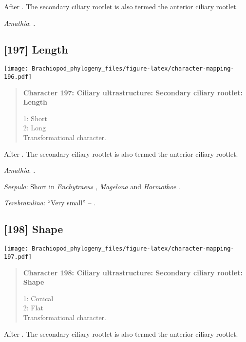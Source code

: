 \documentclass[openany]{book}
\theoremstyle{definition}
\theoremstyle{definition}
\theoremstyle{definition}
\theoremstyle{remark}
\begin{document}
After \citet{Lundin2009}. The secondary ciliary rootlet is also termed
the anterior ciliary rootlet.

\hypertarget{Amathia-coding-196}{}
\emph{Amathia}: \citet{Reed1982}.

\subsection*{{[}197{]} Length}\label{length-1}

\texttt{[image: Brachiopod\_phylogeny\_files/figure-latex/character-mapping-196.pdf]}

\begin{quote}
\textbf{Character 197: Ciliary ultrastructure: Secondary ciliary
rootlet: Length}

1: Short\\
2: Long\\
Transformational character.
\end{quote}

After \citet{Lundin2009}. The secondary ciliary rootlet is also termed
the anterior ciliary rootlet.

\hypertarget{Amathia-coding-197}{}
\emph{Amathia}: \citet{Reed1982}.

\hypertarget{Serpula-coding-197}{}
\emph{Serpula}: Short in \emph{Enchytraeus} \citep{Reger1967},
\emph{Magelona} \citep{Bartolomaeus1995} and \emph{Harmothoe}
\citep{Holborow1969}.

\hypertarget{Terebratulina-coding-197}{}
\emph{Terebratulina}: ``Very small'' -- \citet{Luter1995}.

\subsection*{{[}198{]} Shape}\label{shape-1}

\texttt{[image: Brachiopod\_phylogeny\_files/figure-latex/character-mapping-197.pdf]}

\begin{quote}
\textbf{Character 198: Ciliary ultrastructure: Secondary ciliary
rootlet: Shape}

1: Conical\\
2: Flat\\
Transformational character.
\end{quote}

After \citet{Lundin2009}. The secondary ciliary rootlet is also termed
the anterior ciliary rootlet.
\end{document}
